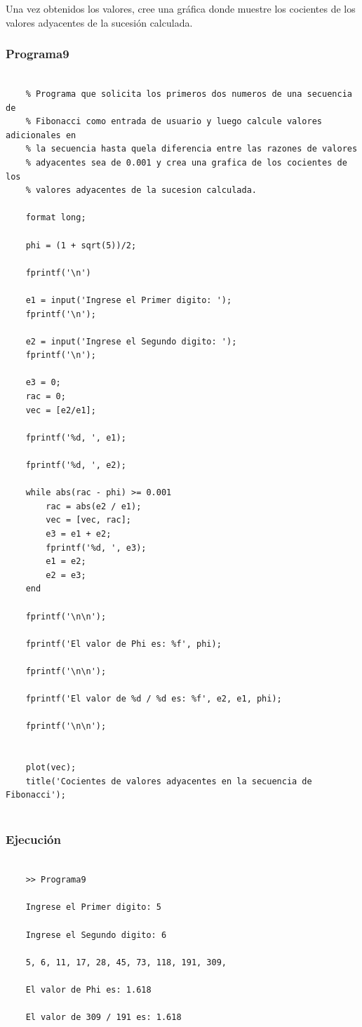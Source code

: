 \documentclass{article}
\begin{document}
	Una vez obtenidos los valores, cree una gráfica donde muestre los cocientes de los valores adyacentes de la sucesión calculada.
	
	\newpage
	
	\subsubsection{Programa9}
	
	\begin{lstlisting}
	
	% Programa que solicita los primeros dos numeros de una secuencia de
	% Fibonacci como entrada de usuario y luego calcule valores adicionales en 
	% la secuencia hasta quela diferencia entre las razones de valores 
	% adyacentes sea de 0.001 y crea una grafica de los cocientes de los 
	% valores adyacentes de la sucesion calculada.
	
	format long;
	
	phi = (1 + sqrt(5))/2;
	
	fprintf('\n')
	
	e1 = input('Ingrese el Primer digito: ');
	fprintf('\n');
	
	e2 = input('Ingrese el Segundo digito: ');
	fprintf('\n');
	
	e3 = 0;
	rac = 0;
	vec = [e2/e1];
	
	fprintf('%d, ', e1);
	
	fprintf('%d, ', e2);
	
	while abs(rac - phi) >= 0.001
		rac = abs(e2 / e1);
		vec = [vec, rac];
		e3 = e1 + e2;
		fprintf('%d, ', e3);
		e1 = e2;
		e2 = e3;
	end
	
	fprintf('\n\n');
	
	fprintf('El valor de Phi es: %f', phi);
	
	fprintf('\n\n');
	
	fprintf('El valor de %d / %d es: %f', e2, e1, phi);
	
	fprintf('\n\n');
	
	
	plot(vec);
	title('Cocientes de valores adyacentes en la secuencia de Fibonacci');
	
	\end{lstlisting}
	
	\newpage
	
	\subsubsection{Ejecución}
	
	\begin{lstlisting}
	
	>> Programa9
	
	Ingrese el Primer digito: 5
	
	Ingrese el Segundo digito: 6
	
	5, 6, 11, 17, 28, 45, 73, 118, 191, 309, 
	
	El valor de Phi es: 1.618
	
	El valor de 309 / 191 es: 1.618
	
	\end{lstlisting}
	
\end{document}
